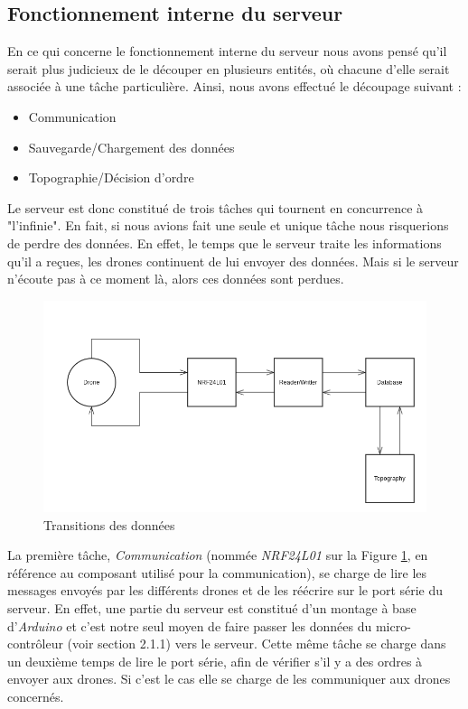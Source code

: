\documentclass[a4paper,10pt]{report}
\begin{document}
      \subsection{Fonctionnement interne du serveur}
	En ce qui concerne le fonctionnement interne du serveur nous avons 
pensé qu'il serait plus judicieux de le découper en plusieurs entités, où 
chacune d'elle serait associée à une tâche particulière. Ainsi, nous avons 
effectué le découpage suivant :

\begin{itemize}
  \item Communication
  \item Sauvegarde/Chargement des données
  \item Topographie/Décision d'ordre
\end{itemize}

	Le serveur est donc constitué de trois tâches qui tournent en 
concurrence à "l'infinie". En fait, si nous avions fait une seule et unique 
tâche nous risquerions de perdre des données. En effet, le temps que le serveur 
traite les informations qu'il a reçues, les drones continuent de lui envoyer 
des données. Mais si le serveur n'écoute pas à ce moment là, alors ces données 
sont perdues.	

	\begin{figure}[htbp]
	  \centering
	  \includegraphics[scale=0.45]{img/server_model.png}
	  \caption{Transitions des données}
	  \label{server_model}
	\end{figure}
	
	La première tâche, \textit{Communication} (nommée \textit{NRF24L01} sur 
la Figure \ref{server_model}, en référence au composant utilisé pour la 
communication), se charge de lire les messages envoyés par les différents 
drones et de les réécrire sur le port série du serveur. En effet, une partie du 
serveur est constitué d'un montage à base d'\textit{Arduino} et c'est notre 
seul moyen de faire passer les données du micro-contrôleur (voir section 2.1.1) 
vers le serveur. Cette même tâche se charge dans un deuxième temps de lire le 
port série, afin de vérifier s'il y a des ordres à envoyer aux drones. Si c'est 
le cas elle se charge de les communiquer aux drones concernés.
\end{document}
